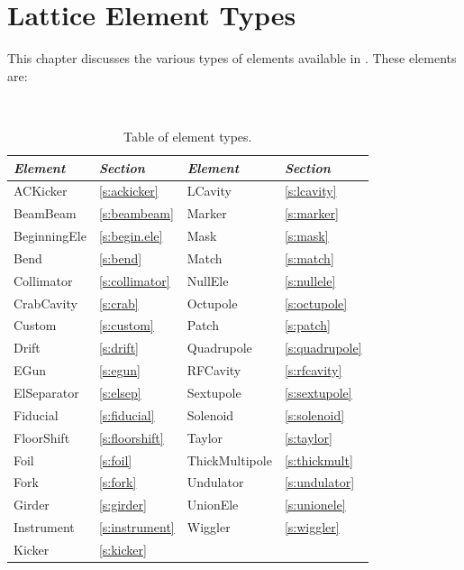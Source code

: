 \chapter{Lattice Element Types}
\label{c:ele.types}


This chapter discusses the various types of elements
available in \accellat.
These elements are:
\begin{table}[htb]
\centering
{\tt
\begin{tabular}{llll} \toprule
  {\it Element}    & {\it Section}         & {\it Element}      & {\it Section}       \\ \midrule
  ACKicker         & \ref{s:ackicker}      &  LCavity          & \ref{s:lcavity}     \\
  BeamBeam         & \ref{s:beambeam}      &  Marker           & \ref{s:marker}      \\
  BeginningEle     & \ref{s:begin.ele}     &  Mask             & \ref{s:mask}        \\ 
  Bend             & \ref{s:bend}          &  Match            & \ref{s:match}       \\
  Collimator       & \ref{s:collimator}    &  NullEle          & \ref{s:nullele}     \\
  CrabCavity       & \ref{s:crab}          &  Octupole         & \ref{s:octupole}    \\ 
  Custom           & \ref{s:custom}        &  Patch            & \ref{s:patch}       \\  
  Drift            & \ref{s:drift}         &  Quadrupole       & \ref{s:quadrupole}  \\ 
  EGun             & \ref{s:egun}          &  RFCavity         & \ref{s:rfcavity}    \\ 
  ElSeparator      & \ref{s:elsep}         &  Sextupole        & \ref{s:sextupole}   \\
  Fiducial         & \ref{s:fiducial}      &  Solenoid         & \ref{s:solenoid}    \\
  FloorShift       & \ref{s:floorshift}    &  Taylor           & \ref{s:taylor}      \\
  Foil             & \ref{s:foil}          &  ThickMultipole   & \ref{s:thickmult}   \\
  Fork             & \ref{s:fork}          &  Undulator        & \ref{s:undulator}   \\
  Girder           & \ref{s:girder}        &  UnionEle         & \ref{s:unionele}    \\
  Instrument       & \ref{s:instrument}    &  Wiggler          & \ref{s:wiggler}     \\
  Kicker           & \ref{s:kicker}        &                   &                     \\
  \bottomrule
\end{tabular}
} 
\caption{Table of element types.}
\label{t:particle.classes}
\end{table}

